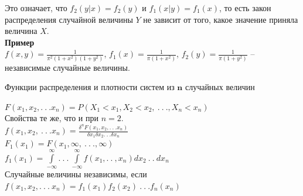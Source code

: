 \documentclass[russian, 12pt, fleqn]{article}
\begin{document}
Это означает, что $f_2(y|x) = f_2(y)$ и $f_1(x|y) = f_1(x)$, то есть закон распределения случайной величины $Y$ не зависит от того, какое значение приняла величина $X$.\\
\textbf{Пример} \\
$f(x, y) = \frac{1}{\pi^2(1+x^2)(1+y^2)}$, $f_1(x) = \frac{1}{\pi(1+x^2)}$, $f_2(y) = \frac{1}{\pi(1+y^2)}$ -- независимые случайные величины.
\begin{center}
$\textbf{Функции распределения и плотности систем из n случайных величин}$\\
\end{center}
 $F(x_1, x_2, .\ .\ . x_n) = P(X_1 < x_1, X_2 < x_2,\ .\ .\ .,X_n < x_n)$\\
Свойства те же, что и при $n = 2$.\\
$f(x_1, x_2, \ .\ .\ .x_n) = \frac{\delta^nF(x_1, x_2, .\ .\ . x_n)}{\delta x_1 \delta x_2 .\ .\ . \delta x_n}$ \\
$F_1(x_1) = F(x_1, \infty, \ .\ .\ ., \infty)$\\
$f_1(x_1) =  \displaystyle{\int \limits_{-\infty}^{\infty}}.\ .\ .\  \displaystyle{\int \limits_{-\infty}^{\infty}} f(x_1, .\  .\ , x_n) dx_2\ .\ .\ dx_n$\\
Случайные величины независимы, если $f(x_1, x_2, .\ .\ .\ x_n)  = f_1(x_1)  f_2(x_2)\ .\ .\ . f_n(x_n)$\\
\end{document}
